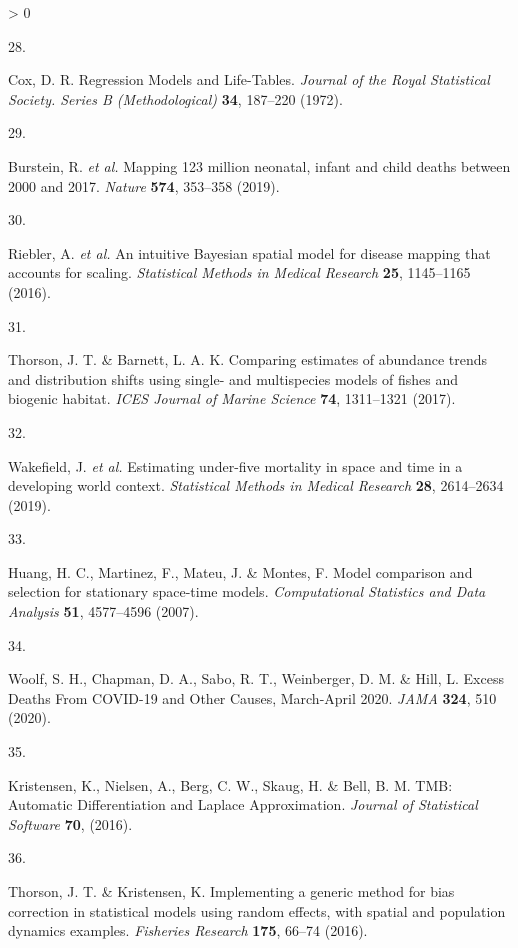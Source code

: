 \documentclass[
]{article}
\newlength{\cslhangindent}
\newlength{\csllabelwidth}
\newenvironment{CSLReferences}[2] %
 {%
  \setlength{\parindent}{0pt}
  \ifodd #1 \everypar{\setlength{\hangindent}{\cslhangindent}}\ignorespaces\fi
  \ifnum #2 > 0
  \setlength{\parskip}{#2\baselineskip}
  \fi
 }%
 {}
\newcommand{\CSLLeftMargin}[1]{\parbox[t]{\csllabelwidth}{#1}}
\newcommand{\CSLRightInline}[1]{\parbox[t]{\linewidth - \csllabelwidth}{#1}\break}
\begin{document}
\begin{CSLReferences}{0}{0}
\leavevmode\hypertarget{ref-Cox1972}{}%
\CSLLeftMargin{28. }
\CSLRightInline{Cox, D. R. {Regression Models and Life-Tables}. \emph{Journal of the Royal Statistical Society. Series B (Methodological)} \textbf{34}, 187--220 (1972).}

\leavevmode\hypertarget{ref-Burstein2019}{}%
\CSLLeftMargin{29. }
\CSLRightInline{Burstein, R. \emph{et al.} {Mapping 123 million neonatal, infant and child deaths between 2000 and 2017}. \emph{Nature} \textbf{574}, 353--358 (2019).}

\leavevmode\hypertarget{ref-Riebler2016}{}%
\CSLLeftMargin{30. }
\CSLRightInline{Riebler, A. \emph{et al.} {An intuitive Bayesian spatial model for disease mapping that accounts for scaling}. \emph{Statistical Methods in Medical Research} \textbf{25}, 1145--1165 (2016).}

\leavevmode\hypertarget{ref-Thorson2017}{}%
\CSLLeftMargin{31. }
\CSLRightInline{Thorson, J. T. \& Barnett, L. A. K. {Comparing estimates of abundance trends and distribution shifts using single- and multispecies models of fishes and biogenic habitat}. \emph{ICES Journal of Marine Science} \textbf{74}, 1311--1321 (2017).}

\leavevmode\hypertarget{ref-Wakefield2019}{}%
\CSLLeftMargin{32. }
\CSLRightInline{Wakefield, J. \emph{et al.} {Estimating under-five mortality in space and time in a developing world context}. \emph{Statistical Methods in Medical Research} \textbf{28}, 2614--2634 (2019).}

\leavevmode\hypertarget{ref-Huang2007}{}%
\CSLLeftMargin{33. }
\CSLRightInline{Huang, H. C., Martinez, F., Mateu, J. \& Montes, F. {Model comparison and selection for stationary space-time models}. \emph{Computational Statistics and Data Analysis} \textbf{51}, 4577--4596 (2007).}

\leavevmode\hypertarget{ref-Woolf2020}{}%
\CSLLeftMargin{34. }
\CSLRightInline{Woolf, S. H., Chapman, D. A., Sabo, R. T., Weinberger, D. M. \& Hill, L. {Excess Deaths From COVID-19 and Other Causes, March-April 2020}. \emph{JAMA} \textbf{324}, 510 (2020).}

\leavevmode\hypertarget{ref-Kristensen2016}{}%
\CSLLeftMargin{35. }
\CSLRightInline{Kristensen, K., Nielsen, A., Berg, C. W., Skaug, H. \& Bell, B. M. {TMB: Automatic Differentiation and Laplace Approximation}. \emph{Journal of Statistical Software} \textbf{70}, (2016).}

\leavevmode\hypertarget{ref-Thorson2016}{}%
\CSLLeftMargin{36. }
\CSLRightInline{Thorson, J. T. \& Kristensen, K. {Implementing a generic method for bias correction in statistical models using random effects, with spatial and population dynamics examples}. \emph{Fisheries Research} \textbf{175}, 66--74 (2016).}


\end{CSLReferences}
\end{document}
